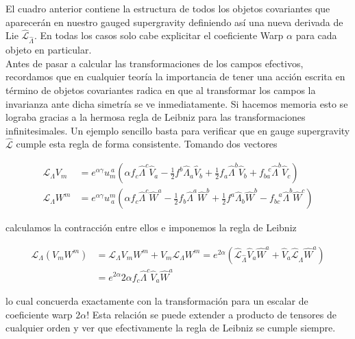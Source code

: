 \documentclass{article}
\numberwithin{equation}{section}
\begin{document}
El cuadro anterior contiene la estructura de todos los objetos covariantes que aparecerán en nuestro gauged supergravity definiendo así una nueva derivada de Lie $ \hat{\mathcal{L}}_{\hat{\Lambda}} $. En todas los casos solo cabe explicitar el coeficiente Warp $ \alpha $ para cada objeto en particular.\\

Antes de pasar a calcular las transformaciones de los campos efectivos, recordamos que en cualquier teoría la importancia de tener una acción escrita en término de objetos covariantes radica en que al transformar los campos la invarianza ante dicha simetría se ve inmediatamente. Si hacemos memoria esto se lograba gracias a la hermosa regla de Leibniz para las transformaciones infinitesimales. Un ejemplo sencillo basta para verificar que en gauge supergravity $ \hat{\mathcal{L}} $ cumple esta regla de forma consistente. Tomando dos vectores

\begin{equation}
\begin{aligned}
\mathcal{L}_{\Lambda} V_{m} &= e^{\alpha \gamma} u_{m}^{\ a} \left(\alpha f_c \hat{\Lambda}^c \hat{V}_{a} - \frac{1}{2}f^b \hat{\Lambda}_a \hat{V}_b + \frac{1}{2} f_a \hat{\Lambda}^b \hat{V}_b + f_{b a}^{\ \ \ c} \hat{\Lambda}^b \hat{V}_{c}\right)\\
\mathcal{L}_{\Lambda} W^{m} &= e^{\alpha \gamma} u^{m}_{\ a} \left(\alpha f_c \hat{\Lambda}^c \hat{W}^{a} - \frac{1}{2}f_b \hat{\Lambda}^a \hat{W}^b + \frac{1}{2} f^a \hat{\Lambda}_b \hat{W}^b - f_{b c}^{\ \ \ a} \hat{\Lambda}^b \hat{W}^{c}\right)
\end{aligned}
\end{equation}

calculamos la contracción entre ellos e imponemos la regla de Leibniz

\begin{equation}
\begin{aligned}
\mathcal{L}_{\Lambda} \left( V_{m} W^m\right) &= \mathcal{L}_{\Lambda} V_m W^m + V_m \mathcal{L}_{\Lambda} W^m = e^{2 \alpha} \left(\hat{\mathcal{L}}_{\hat{\Lambda}} \hat{V}_a \hat{W}^a + \hat{V}_a \hat{\mathcal{L}}_{\hat{\Lambda}} \hat{W}^a\right)\\
&= e^{2 \alpha} 2 \alpha f_c \hat{\Lambda}^c \hat{V}_a \hat{W}^a
\end{aligned}
\end{equation}

lo cual concuerda exactamente con la transformación para un escalar de coeficiente warp $ 2\alpha $! Esta relación se puede extender a producto de tensores de cualquier orden y ver que efectivamente la regla de Leibniz se cumple siempre.\\
\end{document}
